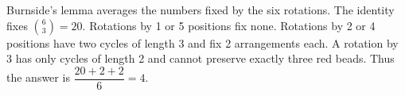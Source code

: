 Burnside's lemma averages the numbers fixed by the six rotations. The identity fixes $\binom63=20$. Rotations by 1 or 5 positions fix none. Rotations by 2 or 4 positions have two cycles of length 3 and fix 2 arrangements each. A rotation by 3 has only cycles of length 2 and cannot preserve exactly three red beads. Thus the answer is $\dfrac{20+2+2}{6}=\boxed4$.
